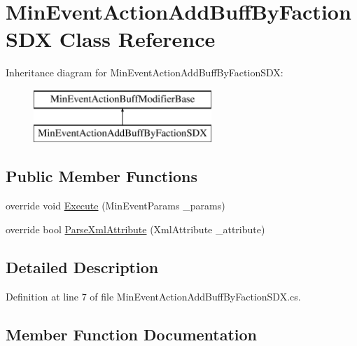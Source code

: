 \hypertarget{class_min_event_action_add_buff_by_faction_s_d_x}{}\section{Min\+Event\+Action\+Add\+Buff\+By\+Faction\+S\+DX Class Reference}
\label{class_min_event_action_add_buff_by_faction_s_d_x}
Inheritance diagram for Min\+Event\+Action\+Add\+Buff\+By\+Faction\+S\+DX\+:\begin{figure}[H]
\begin{center}
\leavevmode
\includegraphics[height=2.000000cm]{class_min_event_action_add_buff_by_faction_s_d_x}
\end{center}
\end{figure}
\subsection*{Public Member Functions}
\begin{DoxyCompactItemize}
\item 
override void \mbox{\hyperlink{class_min_event_action_add_buff_by_faction_s_d_x_a8f88ecf0237613ee91f5d5b0b7f0c0ba}{Execute}} (Min\+Event\+Params \+\_\+params)
\item 
override bool \mbox{\hyperlink{class_min_event_action_add_buff_by_faction_s_d_x_af685f41dd43f9385c06a94bb68ce45a0}{Parse\+Xml\+Attribute}} (Xml\+Attribute \+\_\+attribute)
\end{DoxyCompactItemize}


\subsection{Detailed Description}


Definition at line 7 of file Min\+Event\+Action\+Add\+Buff\+By\+Faction\+S\+D\+X.\+cs.



\subsection{Member Function Documentation}
\mbox{\label{class_min_event_action_add_buff_by_faction_s_d_x_a8f88ecf0237613ee91f5d5b0b7f0c0ba}} 
